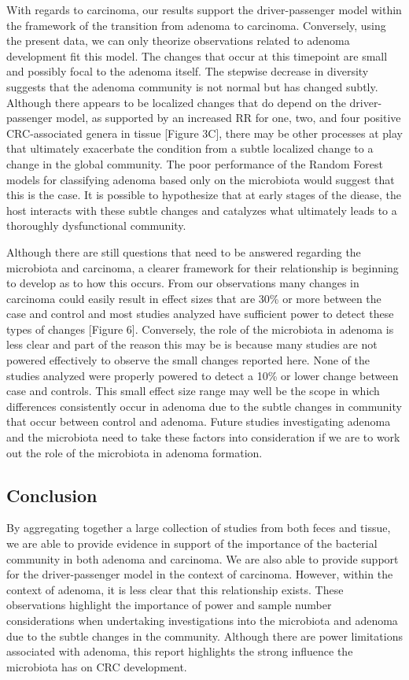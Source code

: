 \documentclass[12pt,]{article}
\begin{document}
With regards to carcinoma, our results support the driver-passenger
model within the framework of the transition from adenoma to carcinoma.
Conversely, using the present data, we can only theorize observations
related to adenoma development fit this model. The changes that occur at
this timepoint are small and possibly focal to the adenoma itself. The
stepwise decrease in diversity suggests that the adenoma community is
not normal but has changed subtly. Although there appears to be
localized changes that do depend on the driver-passenger model, as
supported by an increased RR for one, two, and four positive
CRC-associated genera in tissue {[}Figure 3C{]}, there may be other
processes at play that ultimately exacerbate the condition from a subtle
localized change to a change in the global community. The poor
performance of the Random Forest models for classifying adenoma based
only on the microbiota would suggest that this is the case. It is
possible to hypothesize that at early stages of the diease, the host
interacts with these subtle changes and catalyzes what ultimately leads
to a thoroughly dysfunctional community.

Although there are still questions that need to be answered regarding
the microbiota and carcinoma, a clearer framework for their relationship
is beginning to develop as to how this occurs. From our observations
many changes in carcinoma could easily result in effect sizes that are
30\% or more between the case and control and most studies analyzed have
sufficient power to detect these types of changes {[}Figure 6{]}.
Conversely, the role of the microbiota in adenoma is less clear and part
of the reason this may be is because many studies are not powered
effectively to observe the small changes reported here. None of the
studies analyzed were properly powered to detect a 10\% or lower change
between case and controls. This small effect size range may well be the
scope in which differences consistently occur in adenoma due to the
subtle changes in community that occur between control and adenoma.
Future studies investigating adenoma and the microbiota need to take
these factors into consideration if we are to work out the role of the
microbiota in adenoma formation.

\subsection{Conclusion}\label{conclusion}

By aggregating together a large collection of studies from both feces
and tissue, we are able to provide evidence in support of the importance
of the bacterial community in both adenoma and carcinoma. We are also
able to provide support for the driver-passenger model in the context of
carcinoma. However, within the context of adenoma, it is less clear that
this relationship exists. These observations highlight the importance of
power and sample number considerations when undertaking investigations
into the microbiota and adenoma due to the subtle changes in the
community. Although there are power limitations associated with adenoma,
this report highlights the strong influence the microbiota has on CRC
development.
\end{document}
